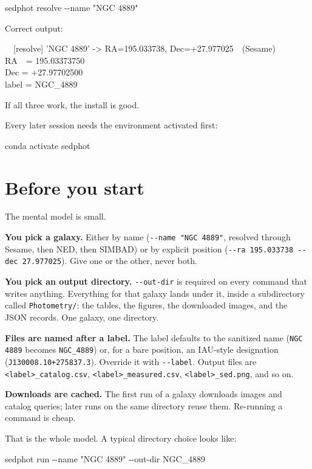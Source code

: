 \documentclass[11pt]{article}
\newcommand{\cmdline}[1]{\begin{cmd}\ttfamily #1\end{cmd}}
\begin{document}
\cmdline{sedphot resolve -{}-name "NGC 4889"}

Correct output:

\begin{cmd}\ttfamily\frenchspacing
\mbox{}~~[resolve] 'NGC 4889' -> RA=195.033738, Dec=+27.977025~~(Sesame)\\
RA~~= 195.03373750\\
Dec = +27.97702500\\
label = NGC\_4889
\end{cmd}

If all three work, the install is good.

Every later session needs the environment activated first:

\cmdline{conda activate sedphot}

\section{Before you start}

The mental model is small.

\textbf{You pick a galaxy.} Either by name (\texttt{-{}-name "NGC 4889"},
resolved through Sesame, then NED, then SIMBAD) or by explicit position
(\texttt{-{}-ra 195.033738 -{}-dec 27.977025}). Give one or the other,
never both.

\textbf{You pick an output directory.} \texttt{-{}-out-dir} is required on
every command that writes anything. Everything for that galaxy lands under
it, inside a subdirectory called \texttt{Photometry/}: the tables, the
figures, the downloaded images, and the JSON records. One galaxy, one
directory.

\textbf{Files are named after a label.} The label defaults to the
sanitized name (\texttt{NGC 4889} becomes \texttt{NGC\_4889}) or, for a
bare position, an IAU-style designation
(\texttt{J130008.10+275837.3}). Override it with \texttt{-{}-label}. Output
files are \texttt{<label>\_catalog.csv},
\texttt{<label>\_measured.csv}, \texttt{<label>\_sed.png}, and so on.

\textbf{Downloads are cached.} The first run of a galaxy downloads images
and catalog queries; later runs on the same directory reuse them.
Re-running a command is cheap.

That is the whole model. A typical directory choice looks like:

\cmdline{sedphot run -{}-name "NGC 4889" -{}-out-dir NGC\_4889}
\end{document}
